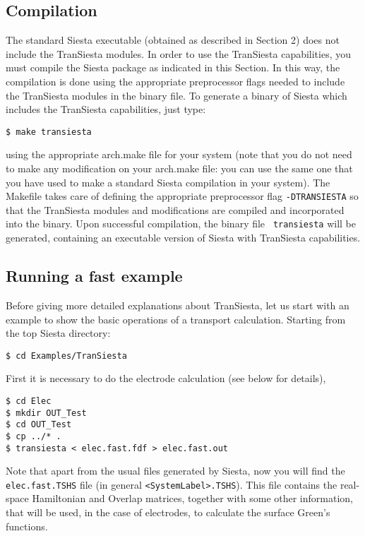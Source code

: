 \documentclass[11pt]{article}
\begin{document}
\subsection{Compilation}

The standard {\sc Siesta} executable (obtained as described in Section
2) does not include the {\sc TranSiesta} modules. In order to use the
{\sc TranSiesta} capabilities, you must compile the {\sc Siesta}
package as indicated in this Section. In this way, the compilation is
done using the appropriate preprocessor flags needed to include the
{\sc TranSiesta} modules in the binary file. To generate a binary of
{\sc Siesta} which includes the {\sc TranSiesta} capabilities, just
type:

\begin{verbatim}
$ make transiesta
\end{verbatim}

using the appropriate arch.make file for your system (note that you do
not need to make any modification on your arch.make file: you can use
the same one that you have used to make a standard {\sc Siesta}
compilation in your system).  The Makefile takes care of defining the
appropriate preprocessor flag \texttt{-DTRANSIESTA} so that the {\sc
  TranSiesta} modules and modifications are compiled and incorporated
into the binary. Upon successful compilation, the binary file {\tt
  transiesta} will be generated, containing an executable version of
{\sc Siesta} with {\sc TranSiesta} capabilities.

\subsection{Running a fast example}

Before giving more detailed explanations about {\sc TranSiesta}, let
us start with an example to show the basic operations of a transport
calculation.  Starting from the top {\sc Siesta} directory:

\begin{verbatim}
$ cd Examples/TranSiesta
\end{verbatim}

First it is necessary to do the electrode calculation (see below for
details),

\begin{verbatim}
$ cd Elec
$ mkdir OUT_Test
$ cd OUT_Test
$ cp ../* .
$ transiesta < elec.fast.fdf > elec.fast.out
\end{verbatim}

Note that apart from the usual files generated by {\sc Siesta}, now you will 
find the {\tt elec.fast.TSHS} file (in general {\tt <SystemLabel>.TSHS}). 
This file contains the real-space Hamiltonian and Overlap matrices, together 
with some other information, that will be used, in the case of electrodes, to 
calculate the surface Green's functions. 
\end{document}
